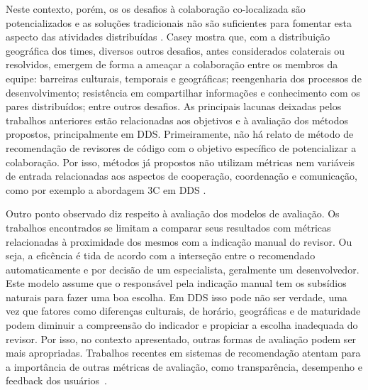 \documentclass[a4paper,12pt]{monografia}
\theoremstyle{plain}
\theoremstyle{definition}
\theoremstyle{remark}
\begin{document}
Neste contexto, porém, os os desafios à colaboração co-localizada são potencializados e as soluções tradicionais não são suficientes para fomentar esta aspecto das atividades distribuídas \cite{nicolaci2011}. Casey \cite{casey2010} mostra que, com a distribuição geográfica dos times, diversos outros desafios, antes considerados colaterais ou resolvidos, emergem de forma a ameaçar a colaboração entre os membros da equipe: barreiras culturais, temporais e geográficas; reengenharia dos processos de desenvolvimento; resistência em compartilhar informações e conhecimento com os pares distribuídos; entre outros desafios.
As principais lacunas deixadas pelos trabalhos anteriores estão relacionadas aos objetivos e à avaliação dos métodos propostos, principalmente em DDS. Primeiramente, não há relato de método de recomendação de revisores de código com o objetivo específico de potencializar a colaboração. Por isso, métodos já propostos não utilizam métricas nem variáveis de entrada relacionadas aos aspectos de cooperação, coordenação e comunicação, como por exemplo a abordagem 3C em DDS \cite{fuks2003}.

Outro ponto observado diz respeito à avaliação dos modelos de avaliação. Os trabalhos encontrados se limitam a comparar seus resultados com métricas relacionadas à proximidade dos mesmos com a indicação manual do revisor. Ou seja, a eficência é tida de acordo com a interseção entre o recomendado automaticamente e por decisão de um especialista, geralmente um desenvolvedor. Este modelo assume que o responsável pela indicação manual tem os subsídios naturais para fazer uma boa escolha. Em DDS isso pode não ser verdade, uma vez que fatores como diferenças culturais, de horário, geográficas e de maturidade podem diminuir a compreensão do indicador e propiciar a escolha inadequada do revisor. Por isso, no contexto apresentado, outras formas de avaliação podem ser mais apropriadas. Trabalhos recentes em sistemas de recomendação atentam para a importância de outras métricas de avaliação, como transparência, desempenho e feedback dos usuários~\cite{he2016}.
\end{document}
